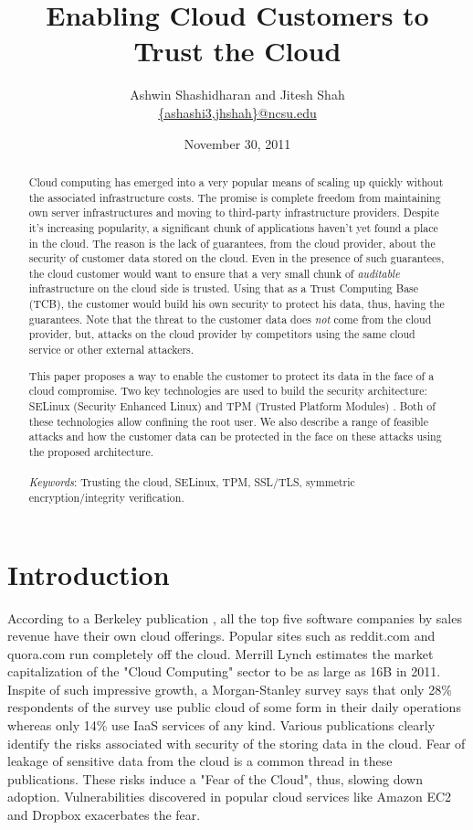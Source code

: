 \documentclass[10pt,twocolumn,pdftex]{article}
\title{Enabling Cloud Customers to Trust the Cloud}
\author{Ashwin Shashidharan and Jitesh Shah \\
\url{{ashashi3,jhshah}@ncsu.edu}
}
\date{November 30, 2011}
\begin{document}
\maketitle

\begin{abstract}
Cloud computing has emerged into a very popular \cite{adoption-survey} means of scaling up quickly without the associated infrastructure costs. The promise is complete freedom from maintaining own server infrastructures and moving to third-party infrastructure providers. Despite it's increasing popularity, a significant chunk of applications haven't yet found a place in the cloud. The reason is the lack of guarantees, from the cloud provider, about the security of customer data stored on the cloud. Even in the presence of such guarantees, the cloud customer would want to ensure that a very small chunk of \emph{auditable} infrastructure on the cloud side is trusted. Using that as a Trust Computing Base (TCB), the customer would build his own security to protect his data, thus, having the guarantees. Note that the threat to the customer data does \emph{not} come from the cloud provider, but, attacks on the cloud provider by competitors using the same cloud service or other external attackers. 

This paper proposes a way to enable the customer to protect its data in the face of a cloud compromise. Two key technologies are used to build the security architecture: SELinux (Security Enhanced Linux) \cite{SELinux} and TPM (Trusted Platform Modules) \cite{TCG}. Both of these technologies allow confining the root user. We also describe a range of feasible attacks and how the customer data can be protected in the face on these attacks using the proposed architecture.\\ \\
\emph{Keywords}:  Trusting the cloud, SELinux, TPM, SSL/TLS, symmetric encryption/integrity verification.
\end{abstract}

\section{Introduction}
According to a Berkeley publication \cite{controlling-data-in-the-cloud}, all the top five software companies by sales revenue have their own cloud offerings. Popular sites such as reddit.com and quora.com run completely off the cloud. Merrill Lynch estimates the market capitalization of the "Cloud Computing" sector to be as large as 16B in 2011. Inspite of such impressive growth, a Morgan-Stanley survey \cite{morgan-stanley} says that only 28\% respondents of the survey use public cloud of some form in their daily operations whereas only 14\% use IaaS services of any kind. Various publications \cite{controlling-data-in-the-cloud, ENISA} clearly identify the risks associated with security of the storing data in the cloud. Fear of leakage of sensitive data from the cloud is a common thread in these publications. These risks induce a "Fear of the Cloud", thus, slowing down adoption. Vulnerabilities discovered in popular cloud services like Amazon EC2 \cite{amazon-ec2-vulnerability} and Dropbox \cite{dropbox-vulnerability} exacerbates the fear. 
\end{document}
